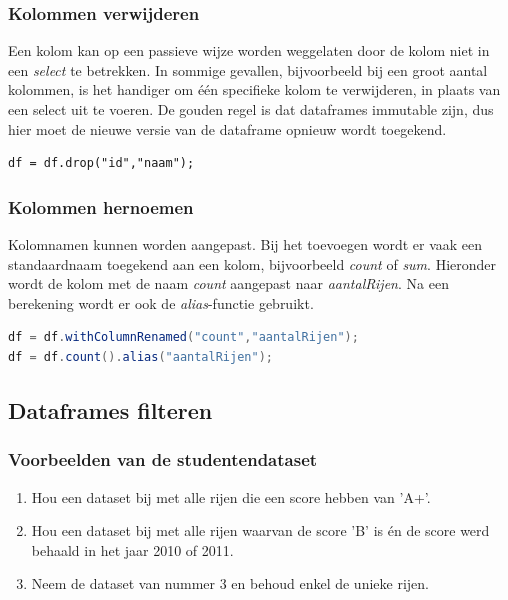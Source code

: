 \documentclass[a4paper,10pt,twoside]{report}
\begin{document}
\subsubsection{Kolommen verwijderen}

Een kolom kan op een passieve wijze worden weggelaten door de kolom niet in een \textit{select} te betrekken. In sommige gevallen, bijvoorbeeld bij een groot aantal kolommen, is het handiger om één specifieke kolom te verwijderen, in plaats van een select uit te voeren. De gouden regel is dat dataframes immutable zijn, dus hier moet de nieuwe versie van de dataframe opnieuw wordt toegekend.

\begin{lstlisting}
df = df.drop("id","naam");
\end{lstlisting}

\subsubsection{Kolommen hernoemen}

Kolomnamen kunnen worden aangepast. Bij het toevoegen wordt er vaak een standaardnaam toegekend aan een kolom, bijvoorbeeld \textit{count} of \textit{sum}. Hieronder wordt de kolom met de naam \textit{count} aangepast naar \textit{aantalRijen}. Na een berekening wordt er ook de \textit{alias}-functie gebruikt. 

\begin{lstlisting}[language=Java]
df = df.withColumnRenamed("count","aantalRijen");
df = df.count().alias("aantalRijen");
\end{lstlisting}

\subsection{Dataframes filteren}

\subsubsection{Voorbeelden van de studentendataset}

\begin{enumerate}
	\item Hou een dataset bij met alle rijen die een score hebben van 'A+'.
	\item Hou een dataset bij met alle rijen waarvan de score 'B' is én de score werd behaald in het jaar 2010 of 2011.
	\item Neem de dataset van nummer 3 en behoud enkel de unieke rijen.
\end{enumerate}
\end{document}

